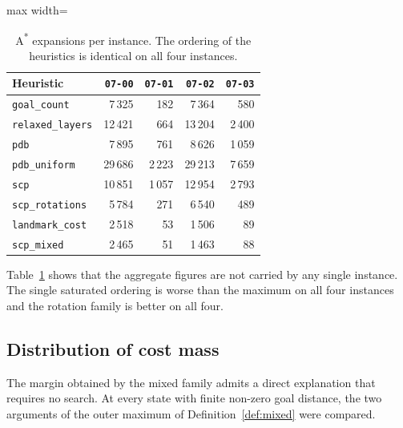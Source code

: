 \documentclass[10pt,twocolumn,a4paper]{article}
\theoremstyle{plain}
\theoremstyle{definition}
\theoremstyle{remark}
\newcommand{\code}[1]{\texttt{#1}}
\begin{document}
\begin{table}[t]
\centering
\caption{A\textsuperscript{*} expansions per instance. The ordering of the
heuristics is identical on all four instances.}
\label{tab:perinstance}
\small
\begin{adjustbox}{max width=\columnwidth}
\begin{tabular}{lrrrr}
\toprule
Heuristic & \code{07-00} & \code{07-01} & \code{07-02} & \code{07-03} \\
\midrule
\code{goal\_count}     & 7\,325  & 182    & 7\,364  & 580 \\
\code{relaxed\_layers} & 12\,421 & 664    & 13\,204 & 2\,400 \\
\code{pdb}             & 7\,895  & 761    & 8\,626  & 1\,059 \\
\code{pdb\_uniform}    & 29\,686 & 2\,223 & 29\,213 & 7\,659 \\
\code{scp}             & 10\,851 & 1\,057 & 12\,954 & 2\,793 \\
\code{scp\_rotations}  & 5\,784  & 271    & 6\,540  & 489 \\
\code{landmark\_cost}  & 2\,518  & 53     & 1\,506  & 89 \\
\code{scp\_mixed}      & 2\,465  & 51     & 1\,463  & 88 \\
\bottomrule
\end{tabular}
\end{adjustbox}
\end{table}

Table~\ref{tab:perinstance} shows that the aggregate figures are not carried by
any single instance. The single saturated ordering is worse than the maximum on
all four instances and the rotation family is better on all four.

\subsection{Distribution of cost mass}
\label{sec:anatomy}

The margin obtained by the mixed family admits a direct explanation that
requires no search. At every state with finite non-zero goal distance, the two
arguments of the outer maximum of Definition~\ref{def:mixed} were compared.
\end{document}
